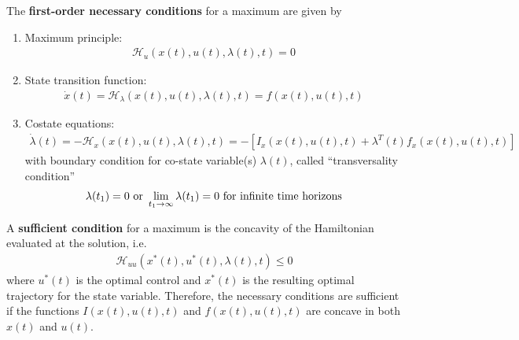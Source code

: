 \documentclass[11pt]{elegantbook}
\begin{document}
\begin{proposition}
    The \textbf{first-order necessary conditions} for a maximum are given by
    \begin{enumerate}
        \item Maximum principle:
        \begin{equation}
            \begin{aligned}
                \mathcal{H}_u(x(t),u(t),\lambda(t),t)=0
            \end{aligned}
            \nonumber
        \end{equation}
        \item State transition function:
        \begin{equation}
            \begin{aligned}
                \dot{x}(t)=\mathcal{H}_\lambda(x(t),u(t),\lambda(t),t)=f(x(t),u(t),t)
            \end{aligned}
            \nonumber
        \end{equation}
        \item Costate equations:
        \begin{equation}
            \begin{aligned}
                \dot{\lambda}(t)=-\mathcal{H}_x(x(t),u(t),\lambda(t),t)=-[I_x(x(t),u(t),t)+\lambda^T(t)f_x(x(t),u(t),t)]
            \end{aligned}
            \nonumber
        \end{equation}
        with boundary condition for co-state variable(s) $\lambda(t)$, called
        “transversality condition”
        \begin{equation}
            \begin{aligned}
                \lambda(t_1)=0 \textnormal{ or }\lim_{t_1 \rightarrow \infty}\lambda(t_1)=0 \textnormal{ for infinite time horizons}
            \end{aligned}
            \nonumber
        \end{equation}
    \end{enumerate}
    A \textbf{sufficient condition} for a maximum is the concavity of the Hamiltonian evaluated at the solution, i.e.
    \begin{equation}
        \begin{aligned}
            \mathcal{H}_{uu}\left(x^*(t),u^*(t),\lambda(t),t\right)\leq 0
        \end{aligned}
        \nonumber
    \end{equation}
    where $u^*(t)$ is the optimal control and $x^*(t)$ is the resulting optimal trajectory for the state variable. Therefore, the necessary conditions are sufficient if the functions $I(x(t),u(t),t)$ and $f(x(t),u(t),t)$ are concave in both $x(t)$ and $u(t)$.
\end{proposition}
\end{document}
